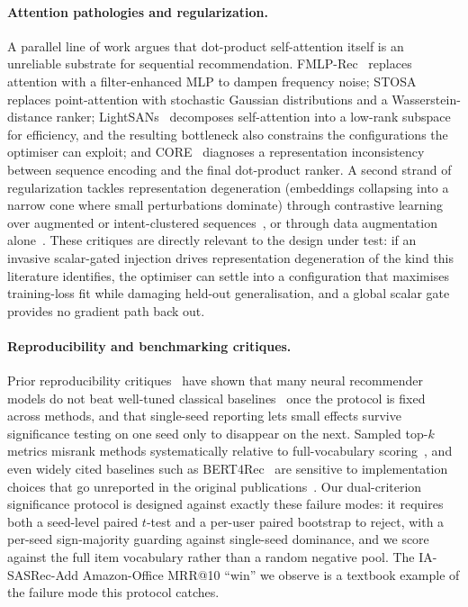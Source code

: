 \paragraph{Attention pathologies and regularization.}
A parallel line of work argues that dot-product self-attention itself
is an unreliable substrate for sequential recommendation.
FMLP-Rec~\citep{zhou2022fmlp} replaces attention with a
filter-enhanced MLP to dampen frequency noise;
STOSA~\citep{fan2022stosa} replaces point-attention with stochastic
Gaussian distributions and a Wasserstein-distance ranker;
LightSANs~\citep{fan2021lightsans} decomposes self-attention into a
low-rank subspace for efficiency, and the resulting bottleneck also
constrains the configurations the optimiser can exploit; and
CORE~\citep{hou2022core} diagnoses a representation inconsistency
between sequence encoding and the final dot-product ranker. A second
strand of regularization tackles representation degeneration
(embeddings collapsing into a narrow cone where small perturbations
dominate) through contrastive learning over augmented or intent-clustered
sequences~\citep{xie2022cl4srec,qiu2022duorec,chen2022iclrec},
or through data augmentation alone~\citep{liu2021asrep}. These
critiques are directly relevant to the design under test: if an
invasive scalar-gated injection drives representation degeneration
of the kind this literature identifies, the optimiser can settle
into a configuration that maximises training-loss fit while damaging
held-out generalisation, and a global scalar gate provides no
gradient path back out.

\paragraph{Reproducibility and benchmarking critiques.}
Prior reproducibility critiques~\citep{ferrari2019,sun2020daisy}
have shown that many neural recommender models do not beat well-tuned
classical baselines~\citep{rendle2020baselines}
once the protocol is fixed across methods, and that single-seed
reporting lets small effects survive significance testing on one seed
only to disappear on the next. Sampled top-$k$ metrics misrank
methods systematically relative to full-vocabulary
scoring~\citep{krichene2020sampled}, and even widely cited baselines
such as BERT4Rec~\citep{sun2019bert4rec} are sensitive to implementation
choices that go unreported in the original publications~\citep{petrov2022replicability}.
Our dual-criterion significance protocol is designed against exactly
these failure modes: it requires both a seed-level paired $t$-test
and a per-user paired bootstrap to reject, with a per-seed sign-majority
guarding against single-seed dominance, and we score against the full
item vocabulary rather than a random negative pool. The IA-SASRec-Add
Amazon-Office MRR@10 ``win'' we observe is a textbook example of the
failure mode this protocol catches.
